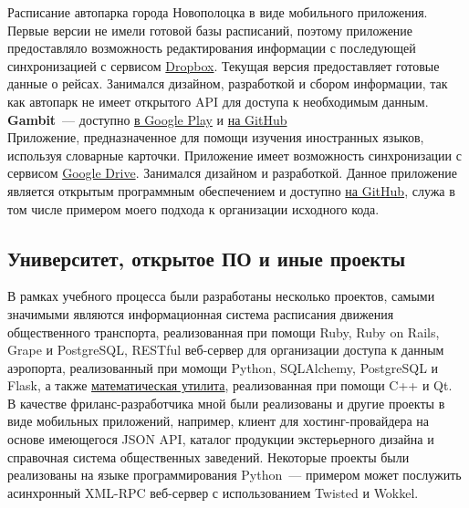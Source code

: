         Расписание автопарка города Новополоцка в виде мобильного приложения.
        Первые версии не имели готовой базы расписаний, поэтому приложение
        предоставляло возможность редактирования информации с последующей синхронизацией
        с сервисом \href{https://dropbox.com}{Dropbox}. Текущая версия
        предоставляет готовые данные о рейсах. Занимался дизайном, разработкой
        и сбором информации, так как автопарк не имеет открытого API для доступа
        к необходимым данным. \\

      \textbf{Gambit}~--- доступно \href{https://play.google.com/store/apps/details?id=ru.ming13.gambit}{в Google Play}
        и \href{https://github.com/ming13/gambit}{на GitHub} \\

        Приложение, предназначенное для помощи изучения иностранных языков,
        используя словарные карточки. Приложение имеет возможность
        синхронизации с сервисом \href{https://drive.google.com}{Google Drive}.
        Занимался дизайном
        и разработкой. Данное приложение является открытым программным обеспечением
        и доступно \href{https://github.com/ming13/gambit}{на GitHub},
        служа в том числе примером моего подхода к организации исходного кода.

    \subsection*{Университет, открытое ПО и иные проекты}

      В рамках учебного процесса были разработаны несколько проектов,
      самыми значимыми являются
      информационная система расписания движения общественного транспорта,
      реализованная при помощи Ruby, Ruby on Rails, Grape и PostgreSQL,
      RESTful веб-сервер для организации доступа к данным аэропорта, реализованный
      при момощи Python, SQLAlchemy, PostgreSQL и Flask, а также
      \href{https://github.com/ming13/aequatio}{математическая утилита},
      реализованная при помощи C++ и Qt. \\

      В качестве фриланс-разработчика
      мной были реализованы и другие проекты в виде мобильных приложений,
      например, клиент для хостинг-провайдера на основе имеющегося
      JSON API, каталог продукции экстерьерного дизайна и справочная система
      общественных заведений.
      Некоторые проекты были реализованы на языке программирования Python~--- примером может послужить
      асинхронный XML-RPC веб-сервер с использованием Twisted и Wokkel. \\

